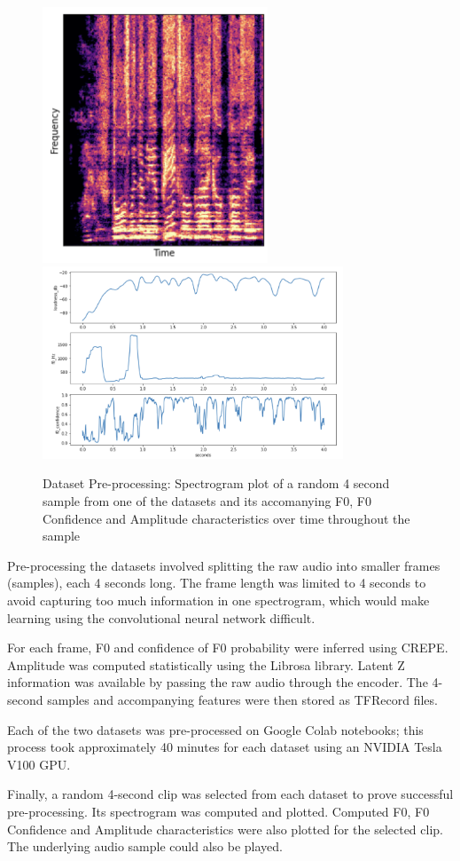 \begin{figure}[H]
    \centering
    \includegraphics[width=0.6\textwidth]{research/dataset_preparation/PreprocessingSpecplot.png}
    \includegraphics[width=0.8\textwidth]{research/dataset_preparation/PreprocessingFeatures.png}
    \caption{Dataset Pre-processing: Spectrogram plot of a random 4 second sample from one of the datasets and its accomanying F0, F0 Confidence and Amplitude characteristics over time throughout the sample}
\end{figure}

Pre-processing the datasets involved splitting the raw audio into smaller frames (samples), each 4 seconds long. The frame length was limited to 4 seconds to avoid capturing too much information in one spectrogram, which would make learning using the convolutional neural network difficult.

For each frame, F0 and confidence of F0 probability were inferred using CREPE\cite{CREPE}. Amplitude was computed statistically using the Librosa library\cite{LibrosaPip}. Latent Z information was available by passing the raw audio through the encoder. The 4-second samples and accompanying features were then stored as TFRecord files.

Each of the two datasets was pre-processed on Google Colab notebooks; this process took approximately 40 minutes for each dataset using an NVIDIA Tesla V100 GPU.

Finally, a random 4-second clip was selected from each dataset to prove successful pre-processing. Its spectrogram was computed and plotted. Computed F0, F0 Confidence and Amplitude characteristics were also plotted for the selected clip. The underlying audio sample could also be played.
